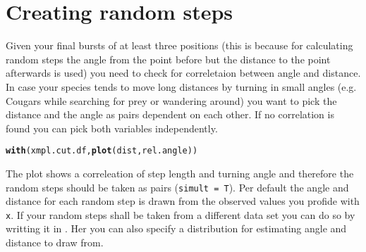 \documentclass[11pt, a4paper]{article}\usepackage[]{graphicx}\usepackage[]{color}
\makeatletter
\newcommand{\hlstd}[1]{\textcolor[rgb]{0.345,0.345,0.345}{#1}}%
\newcommand{\hlkwd}[1]{\textcolor[rgb]{0.737,0.353,0.396}{\textbf{#1}}}%
\newenvironment{kframe}{%
 \def\at@end@of@kframe{}%
 \ifinner\ifhmode%
  \def\at@end@of@kframe{\end{minipage}}%
  \begin{minipage}{\columnwidth}%
 \fi\fi%
 \def\FrameCommand##1{\hskip\@totalleftmargin \hskip-\fboxsep
 \colorbox{shadecolor}{##1}\hskip-\fboxsep
     \hskip-\linewidth \hskip-\@totalleftmargin \hskip\columnwidth}%
 \MakeFramed {\advance\hsize-\width
   \@totalleftmargin\z@ \linewidth\hsize
   \@setminipage}}%
 {\par\unskip\endMakeFramed%
 \at@end@of@kframe}
\newenvironment{knitrout}{}{} %
\makeatother
\begin{document}

  
  


\section{Creating random steps}

Given your final bursts of at least three positions (this is because for calculating random steps the angle from the point before but the distance to the point afterwards is used) you need to check for correletaion between angle and distance. In case your species tends to move long distances by turning in small angles (e.g. Cougars while searching for prey or wandering around) you want to pick the distance and the angle as pairs dependent on each other. If no correlation is found you can pick both variables independently.

\begin{knitrout}
\color{fgcolor}\begin{kframe}


{\ttfamily\noindent\bfseries{}}\end{kframe}
\end{knitrout}

\begin{knitrout}
\color{fgcolor}\begin{kframe}
\begin{alltt}
\hlkwd{with}\hlstd{(xmpl.cut.df,} \hlkwd{plot}\hlstd{(dist, rel.angle))}
\end{alltt}


{\ttfamily\noindent\bfseries\color{errorcolor}{\#\# Error in with(xmpl.cut.df, plot(dist, rel.angle)): object 'xmpl.cut.df' not found}}\end{kframe}
\end{knitrout}

The plot shows a correleation of step length and turning angle and therefore the random steps should be taken as pairs (\texttt{simult = T}). Per default the angle and distance for each random step is drawn from the observed values you profide with \texttt{x}. If your random steps shall be taken from a different data set you can do so by writting it in . Her you can also specify a distribution for estimating angle and distance to draw from. 
\end{document}
